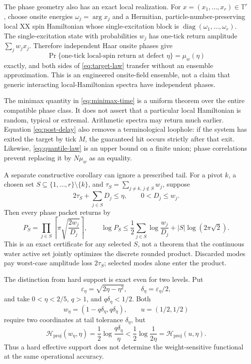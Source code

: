 \documentclass[10pt]{article}
\theoremstyle{definition}
\newcommand{\T}{\mathbb T}
\newcommand{\proj}{\mathrm{proj}}
\newcommand{\Hwater}{\mathcal H}
\begin{document}
The phase geometry also has an exact local realization.  For
\(x=(x_1,\ldots,x_r)\in\T^r\), choose onsite energies
\(\omega_j=\arg x_j\) and a Hermitian, particle-number-preserving local XX
spin Hamiltonian whose single-excitation block is
\(\operatorname{diag}(\omega_1,\ldots,\omega_r)\).  The single-excitation
state with probabilities \(w_j\) has one-tick return amplitude
\(\sum_jw_jx_j\).  Therefore independent Haar onsite phases give
\begin{equation}
 \Pr\{\text{one-tick local-spin return at defect }\eta\}
 =\mu_w(\eta)
\label{eq:local-transfer}
\end{equation}
exactly, and both sides of \eqref{eq:target-law} transfer without an ensemble
approximation.  This is an engineered onsite-field ensemble, not a claim that
generic interacting local-Hamiltonian spectra have independent phases.

The minimax quantity in \eqref{eq:minimax-time} is a uniform theorem over the
entire compatible phase class.  It does not assert that a particular local
Hamiltonian is random, typical or extremal.  Arithmetic spectra may return
much earlier.  Equation \eqref{eq:post-delay} also removes a terminological
loophole: if the system has exited the target by tick \(M\), the guaranteed
hit occurs strictly after that exit.  Likewise, \eqref{eq:quantile-law} is an upper bound on a
finite union; phase correlations prevent replacing it by \(N\mu_w\) as an
equality.

A separate constructive corollary can ignore a prescribed tail.  For a pivot
\(k\), a chosen set \(S\subseteq\{1,\ldots,r\}\setminus\{k\}\), and
\(\tau_S=\sum_{j\ne k,\,j\notin S}w_j\), suppose
\begin{equation}
 2\tau_S+\sum_{j\in S}D_j\leq\eta,\qquad 0<D_j\leq w_j.
 \label{eq:selected-feasible}
\end{equation}
Then every phase packet returns by
\begin{equation}
 P_S=\prod_{j\in S}
 \left\lceil\pi\sqrt{\frac{2w_j}{D_j}}\right\rceil,
 \qquad
 \log P_S\leq
 \frac12\sum_{j\in S}\log\frac{w_j}{D_j}
 +|S|\log(2\pi\sqrt2).
\label{eq:selected-ceiling}
\end{equation}
This is an exact certificate for any selected \(S\), not a theorem that the
continuous water active set jointly optimizes the discrete rounded product.
Discarded modes pay worst-case amplitude loss \(2\tau_S\); selected modes
alone enter the product.

The distinction from hard support is exact even for two levels.  Put
\[
 \varepsilon_\eta=\sqrt{2\eta-\eta^2},\qquad
 \delta_\eta=\varepsilon_\eta/2,
\]
and take \(0<\eta<2/5\), \(q>1\), and \(q\delta_\eta<1/2\).  Both
\[
 w_\eta=(1-q\delta_\eta,q\delta_\eta),\qquad u=(1/2,1/2)
\]
require two coordinates at tail tolerance \(\delta_\eta\), but
\begin{equation}
 \Hwater_{\proj}(w_\eta,\eta)
 =\frac12\log\frac{q\delta_\eta}{\eta}
 <\frac12\log\frac{1}{2\eta}
 =\Hwater_{\proj}(u,\eta).
\label{eq:support-separation}
\end{equation}
Thus a hard effective support does not determine the weight-sensitive
functional at the same operational accuracy.
\end{document}
